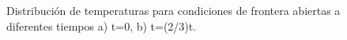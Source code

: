 \documentclass{report}
\begin{document}
\begin{figure}[H]
    \centering 
   \caption{Distribución de temperaturas para condiciones de frontera abiertas a diferentes tiempos a) t=0, b) t=(2/3)t.}
    \label{fig:Condicionesabiertas}
\end{figure}
\end{document}
